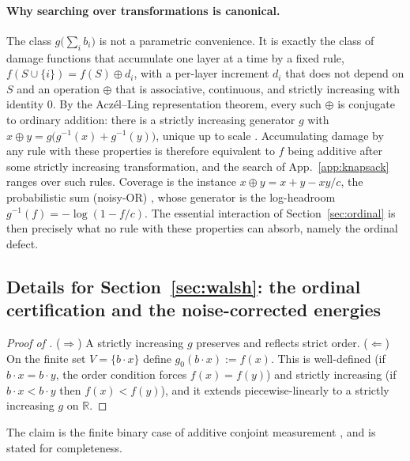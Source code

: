 \paragraph{Why searching over transformations is canonical.} The class $g\bigl(\sum_i b_i\bigr)$ is not a
parametric convenience. It is exactly the class of damage functions that accumulate one layer at a time by
a fixed rule, $f(S\cup\{i\}) = f(S) \oplus d_i$, with a per-layer increment $d_i$ that does not depend on
$S$ and an operation $\oplus$ that is associative, continuous, and strictly increasing with identity $0$.
By the Acz\'el--Ling
representation theorem, every such $\oplus$ is conjugate to ordinary addition: there is a strictly
increasing generator $g$ with $x\oplus y = g\bigl(g^{-1}(x)+g^{-1}(y)\bigr)$, unique up to scale
\citep{aczel1966fe,ling1965assoc}. Accumulating damage by any rule with these properties is therefore
equivalent to $f$ being additive after some strictly increasing transformation, and the search of
App.~\ref{app:knapsack} ranges over such
rules. Coverage is the instance $x\oplus y = x+y-xy/c$, the probabilistic sum (noisy-OR)
\citep{pearl1988probabilistic,klement2000tnorms}, whose generator is the log-headroom
$g^{-1}(f) = -\log(1-f/c)$. 
The essential interaction of Section~\ref{sec:ordinal} is then precisely what no rule with
these properties can absorb,
namely the ordinal defect.

\subsection{Details for Section~\ref{sec:walsh}: the ordinal certification and the noise-corrected
energies}\label{app:ordinal}

\begin{proof}[Proof of \thmtwo]
($\Rightarrow$) A strictly increasing $g$ preserves and reflects strict order. ($\Leftarrow$) On the finite
set $V=\{b\cdot x\}$ define $g_0(b\cdot x):=f(x)$. This is well-defined (if $b\cdot x=b\cdot y$, the order
condition forces $f(x)=f(y)$) and strictly increasing (if $b\cdot x<b\cdot y$ then $f(x)<f(y)$), and it
extends piecewise-linearly to a strictly increasing $g$ on $\mathbb{R}$.
\end{proof}

The claim is the finite binary case of additive conjoint measurement
\citep{lucetukey1964conjoint,debreu1960topological,scott1964measurement}, and is stated for
completeness.

